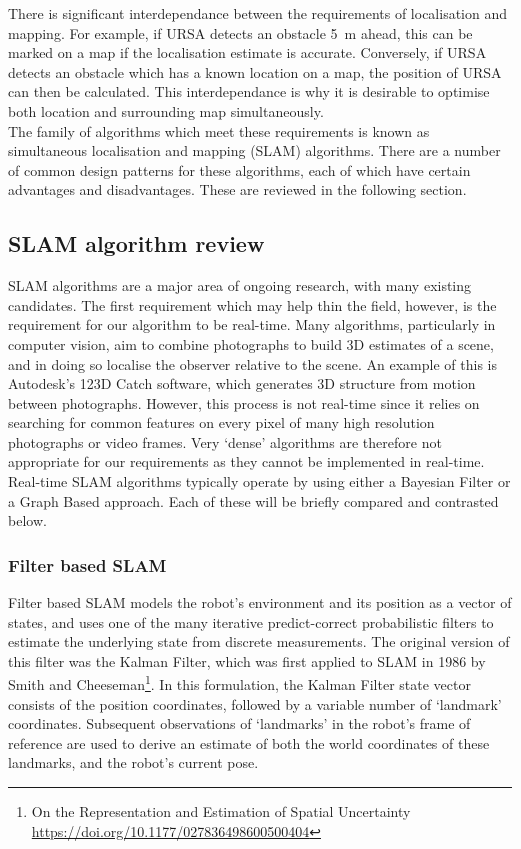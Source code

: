 \documentclass[capstone_report.tex]{subfiles}
\begin{document}
    There is significant interdependance between the requirements of localisation and mapping. For example, if URSA detects an obstacle \SI{5}{\meter} ahead, this can be marked on a map if the localisation estimate is accurate. Conversely, if URSA detects an obstacle which has a known location on a map, the position of URSA can then be calculated. This interdependance is why it is desirable to optimise both location and surrounding map simultaneously. \\

    The family of algorithms which meet these requirements is known as simultaneous localisation and mapping (SLAM) algorithms. There are a number of common design patterns for these algorithms, each of which have certain advantages and disadvantages. These are reviewed in the following section.

    \subsection{SLAM algorithm review}
    SLAM algorithms are a major area of ongoing research, with many existing candidates. The first requirement which may help thin the field, however, is the requirement for our algorithm to be real-time. Many algorithms, particularly in computer vision, aim to combine photographs to build 3D estimates of a scene, and in doing so localise the observer relative to the scene. An example of this is Autodesk's 123D Catch software, which generates 3D structure from motion between photographs. However, this process is not real-time since it relies on searching for common features on every pixel of many high resolution photographs or video frames. Very `dense' algorithms are therefore not appropriate for our requirements as they cannot be implemented in real-time. \\

    Real-time SLAM algorithms typically operate by using either a Bayesian Filter or a Graph Based approach. Each of these will be briefly compared and contrasted below.

    \subsubsection{Filter based SLAM}
    Filter based SLAM models the robot's environment and its position as a vector of states, and uses one of the many iterative predict-correct probabilistic filters to estimate the underlying state from discrete measurements. The original version of this filter was the Kalman Filter, which was first applied to SLAM in 1986 by Smith and Cheeseman\footnote{On the Representation and Estimation of Spatial Uncertainty \url{https://doi.org/10.1177/027836498600500404}}. In this formulation, the Kalman Filter state vector consists of the position coordinates, followed by a variable number of `landmark' coordinates. Subsequent observations of `landmarks' in the robot's frame of reference are used to derive an estimate of both the world coordinates of these landmarks, and the robot's current pose. \\
\end{document}
